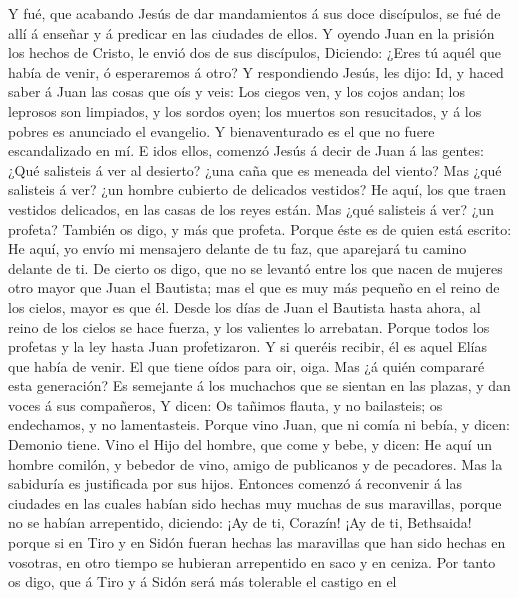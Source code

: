  Y fué, que acabando Jesús de dar mandamientos á sus doce
discípulos, se fué de allí á enseñar y á predicar en las ciudades de
ellos.  Y oyendo Juan en la prisión los hechos de Cristo, le
envió dos de sus discípulos,  Diciendo: ¿Eres tú aquél que
había de venir, ó esperaremos á otro?  Y respondiendo Jesús,
les dijo: Id, y haced saber á Juan las cosas que oís y veis:
 Los ciegos ven, y los cojos andan; los leprosos son
limpiados, y los sordos oyen; los muertos son resucitados, y á los
pobres es anunciado el evangelio.  Y bienaventurado es el
que no fuere escandalizado en mí.  E idos ellos, comenzó
Jesús á decir de Juan á las gentes: ¿Qué salisteis á ver al desierto?
¿una caña que es meneada del viento?  Mas ¿qué salisteis á
ver? ¿un hombre cubierto de delicados vestidos? He aquí, los que traen
vestidos delicados, en las casas de los reyes están.  Mas
¿qué salisteis á ver? ¿un profeta? También os digo, y más que profeta.
 Porque éste es de quien está escrito: He aquí, yo envío mi
mensajero delante de tu faz, que aparejará tu camino delante de ti.
 De cierto os digo, que no se levantó entre los que nacen
de mujeres otro mayor que Juan el Bautista; mas el que es muy más
pequeño en el reino de los cielos, mayor es que él.  Desde
los días de Juan el Bautista hasta ahora, al reino de los cielos se hace
fuerza, y los valientes lo arrebatan.  Porque todos los
profetas y la ley hasta Juan profetizaron.  Y si queréis
recibir, él es aquel Elías que había de venir.  El que
tiene oídos para oir, oiga.  Mas ¿á quién compararé esta
generación? Es semejante á los muchachos que se sientan en las plazas, y
dan voces á sus compañeros,  Y dicen: Os tañimos flauta, y
no bailasteis; os endechamos, y no lamentasteis.  Porque
vino Juan, que ni comía ni bebía, y dicen: Demonio tiene. 
Vino el Hijo del hombre, que come y bebe, y dicen: He aquí un hombre
comilón, y bebedor de vino, amigo de publicanos y de pecadores. Mas la
sabiduría es justificada por sus hijos.  Entonces comenzó á
reconvenir á las ciudades en las cuales habían sido hechas muy muchas de
sus maravillas, porque no se habían arrepentido, diciendo: 
¡Ay de ti, Corazín! ¡Ay de ti, Bethsaida! porque si en Tiro y en Sidón
fueran hechas las maravillas que han sido hechas en vosotras, en otro
tiempo se hubieran arrepentido en saco y en ceniza.  Por
tanto os digo, que á Tiro y á Sidón será más tolerable el castigo en el
